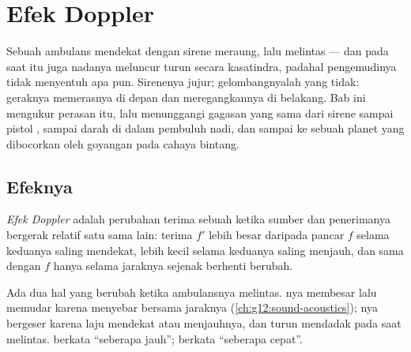 \chapter{Efek Doppler}\label{ch:g12:doppler-effect}

Sebuah ambulans mendekat dengan sirene meraung, lalu melintas --- dan pada saat itu juga
nadanya meluncur turun secara kasatindra, padahal pengemudinya tidak menyentuh apa pun.
Sirenenya jujur; gelombangnyalah yang tidak: geraknya memerasnya di depan dan
meregangkannya di belakang. Bab ini mengukur perasan itu, lalu menunggangi gagasan yang
sama dari sirene sampai pistol , sampai darah di dalam pembuluh nadi, dan sampai ke
sebuah planet yang dibocorkan oleh goyangan pada cahaya bintang.

\section{Efeknya}

\begin{definition}\label{def:g12:doppler-effect:doppler}
\emph{Efek Doppler} adalah perubahan  terima sebuah 
ketika sumber dan penerimanya bergerak relatif satu sama lain:  terima $f'$ lebih
besar daripada  pancar $f$ selama keduanya saling mendekat, lebih kecil selama
keduanya saling menjauh, dan sama dengan $f$ hanya selama jaraknya sejenak berhenti
berubah.
\end{definition}

\begin{remark}\label{rem:g12:doppler-effect:pitch}
Ada dua hal yang berubah ketika ambulansnya melintas. \emph{}nya membesar lalu
memudar karena  menyebar bersama jaraknya (\cref{ch:g12:sound-acoustics});
\emph{}nya bergeser karena laju mendekat atau menjauhnya, dan turun mendadak
pada saat melintas.  berkata ``seberapa jauh'';  berkata ``seberapa
cepat''.
\end{remark}

